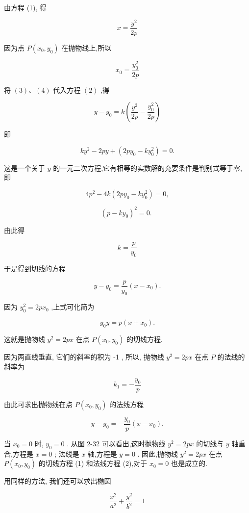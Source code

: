 \documentclass[lang=cn,newtx,10pt,scheme=chinese]{elegantbook}
\begin{document}
由方程 (1), 得

\[
  x = \frac{{y}^{2}}{2p} \tag{3}
\]

因为点 \(P\left( {{x}_{0},{y}_{0}}\right)\) 在抛物线上,所以

\[
    {x}_{0} = \frac{{y}_{0}^{2}}{2p} \tag{4}
\]

将 \(\left( 3\right) \text{、}\left( 4\right)\) 代入方程 \(\left( 2\right)\) ,得

\[
  y - {y}_{0} = k\left( {\frac{{y}^{2}}{2p} - \frac{{y}_{0}^{2}}{2p}}\right)
\]

即

\[
  k{y}^{2} - {2py} + \left( {{2p}{y}_{0} - k{y}_{0}^{2}}\right) = 0.
\]

这是一个关于 \(y\) 的一元二次方程,它有相等的实数解的充要条件是判别式等于零, 即

\[
  4{p}^{2} - {4k}\left( {{2p}{y}_{0} - k{y}_{0}^{2}}\right) = 0,
\]

\[
    {\left( p - k{y}_{0}\right) }^{2} = 0\text{. }
\]

由此得

\[
  k = \frac{p}{{y}_{0}}
\]

于是得到切线的方程

\[
  y - {y}_{0} = \frac{p}{{y}_{0}}\left( {x - {x}_{0}}\right) .
\]

因为 \({y}_{0}^{2} = {2p}{x}_{0}\) ,上式可化简为

\[
    {y}_{0}y = p\left( {x + {x}_{0}}\right) . \tag{1}
\]

这就是抛物线 \({y}^{2} = {2px}\) 在点 \(P\left( {{x}_{0},{y}_{0}}\right)\) 的切线方程.

因为两直线垂直, 它们的斜率的积为 -1 , 所以, 抛物线 \({y}^{2} = {2px}\) 在点 \(P\) 的法线的斜率为

\[
    {k}_{1} = - \frac{{y}_{0}}{p}
\]

由此可求出抛物线在点 \(P\left( {{x}_{0},{y}_{0}}\right)\) 的法线方程

\[
  y - {y}_{0} = - \frac{{y}_{0}}{p}\left( {x - {x}_{0}}\right) . \tag{2}
\]

当 \({x}_{0} = 0\) 时, \({y}_{0} = 0\) . 从图 2-32 可以看出,这时抛物线 \({y}^{2} = {2px}\) 的切线与 \(y\) 轴重合,方程是 \(x = 0\) ; 法线是 \(x\) 轴,方程是 \(y = 0\) . 因此,抛物线 \({y}^{2} = {2px}\) 在点 \(P\left( {{x}_{0},{y}_{0}}\right)\) 的切线方程 (1) 和法线方程 (2),对于 \({x}_{0} = 0\) 也是成立的.

用同样的方法, 我们还可以求出椭圆

\[
  \frac{{x}^{2}}{{a}^{2}} + \frac{{y}^{2}}{{b}^{2}} = 1
\]
\end{document}

